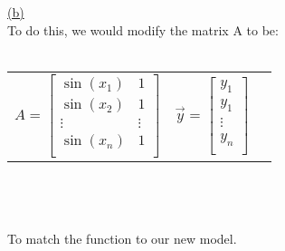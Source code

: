 \documentclass[12pt]{article}
\begin{document}
\hyperlink{toc}{\hypertarget{5.2}{(b)}}\\
To do this, we would modify the matrix A to be:
\\\\
\begin{tabularx}{\textwidth}{>{\centering\arraybackslash}X >{\centering\arraybackslash}X >{\centering\arraybackslash}X}
	 $A = \begin{bmatrix}
		 \sin(x_1) & 1\\
		 \sin(x_2) & 1\\
		 \vdots & \vdots\\
		 \sin(x_n) & 1\\
	 \end{bmatrix}$ & $\vec{y} = \begin{bmatrix}
		y_1\\
		y_1\\
		\vdots\\
		y_n\\
	\end{bmatrix}$
\end{tabularx}
\\\\\\
To match the function to our new model.
\\\\\\
\end{document}
